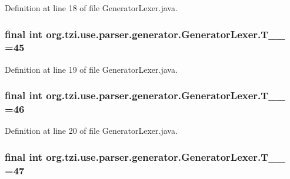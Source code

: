 Definition at line 18 of file Generator\-Lexer.\-java.

\hypertarget{classorg_1_1tzi_1_1use_1_1parser_1_1generator_1_1_generator_lexer_a300984330039b14d62e46202ea6a1905}{
\subsubsection[{T\-\_\-\-\_\-45}]{\setlength{\rightskip}{0pt plus 5cm}final int org.\-tzi.\-use.\-parser.\-generator.\-Generator\-Lexer.\-T\-\_\-\-\_ =45\hspace{0.3cm}{\ttfamily [static]}}}\label{classorg_1_1tzi_1_1use_1_1parser_1_1generator_1_1_generator_lexer_a300984330039b14d62e46202ea6a1905}


Definition at line 19 of file Generator\-Lexer.\-java.

\hypertarget{classorg_1_1tzi_1_1use_1_1parser_1_1generator_1_1_generator_lexer_a7f5f1f8403e006bb4b6f07327bc42359}{
\subsubsection[{T\-\_\-\-\_\-46}]{\setlength{\rightskip}{0pt plus 5cm}final int org.\-tzi.\-use.\-parser.\-generator.\-Generator\-Lexer.\-T\-\_\-\-\_ =46\hspace{0.3cm}{\ttfamily [static]}}}\label{classorg_1_1tzi_1_1use_1_1parser_1_1generator_1_1_generator_lexer_a7f5f1f8403e006bb4b6f07327bc42359}


Definition at line 20 of file Generator\-Lexer.\-java.

\hypertarget{classorg_1_1tzi_1_1use_1_1parser_1_1generator_1_1_generator_lexer_ae5a40ce982801cc2f01cdd39e00aa475}{
\subsubsection[{T\-\_\-\-\_\-47}]{\setlength{\rightskip}{0pt plus 5cm}final int org.\-tzi.\-use.\-parser.\-generator.\-Generator\-Lexer.\-T\-\_\-\-\_ =47\hspace{0.3cm}{\ttfamily [static]}}}\label{classorg_1_1tzi_1_1use_1_1parser_1_1generator_1_1_generator_lexer_ae5a40ce982801cc2f01cdd39e00aa475}


